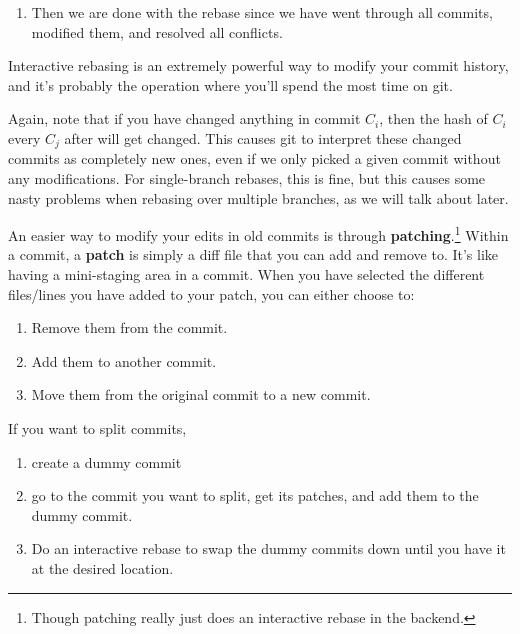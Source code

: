 \documentclass{article}
\begin{document}
\begin{definition}[Rebasing]
\begin{enumerate}
        \item Then we are done with the rebase since we have went through all commits, modified them, and resolved all conflicts. 
      \end{enumerate}
      Interactive rebasing is an extremely powerful way to modify your commit history, and it's probably the operation where you'll spend the most time on git. 
    \end{definition} 

    Again, note that if you have changed anything in commit $C_i$, then the hash of $C_i$ every $C_j$ after will get changed. This causes git to interpret these changed commits as completely new ones, even if we only picked a given commit without any modifications. For single-branch rebases, this is fine, but this causes some nasty problems when rebasing over multiple branches, as we will talk about later. 

    \begin{definition}[Patching]
      An easier way to modify your edits in old commits is through \textbf{patching}.\footnote{Though patching really just does an interactive rebase in the backend.} Within a commit, a \textbf{patch} is simply a diff file that you can add and remove to. It's like having a mini-staging area in a commit. When you have selected the different files/lines you have added to your patch, you can either choose to: 
      \begin{enumerate}
        \item Remove them from the commit. 
        \item Add them to another commit. 
        \item Move them from the original commit to a new commit. 
      \end{enumerate}
    \end{definition}

    \begin{theorem}
      If you want to split commits, 
      \begin{enumerate}
        \item create a dummy commit 
        \item go to the commit you want to split, get its patches, and add them to the dummy commit. 
        \item Do an interactive rebase to swap the dummy commits down until you have it at the desired location. 
      \end{enumerate}
    \end{theorem} 
\end{document}
